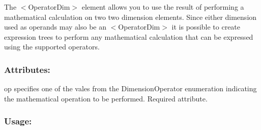 The {\ttfamily $<$Operator\+Dim$>$} element allows you to use the result of performing a mathematical calculation on two two dimension elements. Since either dimension used as operands may also be an {\ttfamily $<$Operator\+Dim$>$} it is possible to create expression trees to perform any mathematical calculation that can be expressed using the supported operators.\hypertarget{fal_element_ref_fal_elem_ref_sec_operatordim_2}{}\subsubsection{Attributes\+:}\label{fal_element_ref_fal_elem_ref_sec_operatordim_2}
\begin{DoxyItemize}
\item {\ttfamily op} specifies one of the vales from the Dimension\+Operator enumeration indicating the mathematical operation to be performed. Required attribute.\end{DoxyItemize}
\hypertarget{fal_element_ref_fal_elem_ref_sec_operatordim_3}{}\subsubsection{Usage\+:}\label{fal_element_ref_fal_elem_ref_sec_operatordim_3}

